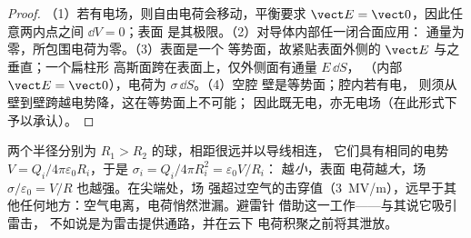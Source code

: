 \begin{proof}
（1）若有电场，则自由电荷会移动，平衡要求 $\vect E =
\vect 0$，因此任意两内点之间 $\dd V = 0$；表面
是其极限。（2）对导体内部任一闭合面应用：
通量为零，所包围电荷为零。（3）表面是一个
等势面，故紧贴表面外侧的 $\vect E$ 与之垂直；一个扁柱形
高斯面跨在表面上，仅外侧面有通量 $E\,\dd S$，
（内部 $\vect E = \vect 0$），电荷为 $\sigma\,\dd S$。（4）空腔
壁是等势面；腔内若有电，
则须从壁到壁跨越电势降，这在等势面上不可能；
因此既无电，亦无电场（在此形式下予以承认）。
\end{proof}

\begin{example}[尖端效应与避雷针]\label{ex:b1:potential-capacitors:point}
两个半径分别为 $R_1 > R_2$ 的球，相距很远并以导线相连，
它们具有相同的电势 $V = Q_i/4\pi\varepsilon_0R_i$，于是 $\sigma_i = Q_i/4\pi R_i^2 = \varepsilon_0V/R_i$：
越\emph{小}，表面
电荷越\emph{大}，场 $\sigma/\varepsilon_0 = V/R$ 也越强。在尖端处，场
强超过空气的击穿值（\qty{3}{MV/m}），远早于其
他任何地方：空气电离，电荷悄然泄漏。避雷针
借助这一\emph{}工作——与其说它吸引雷击，
不如说是为雷击提供通路，并在云下
电荷积聚之前将其泄放。
\end{example}

